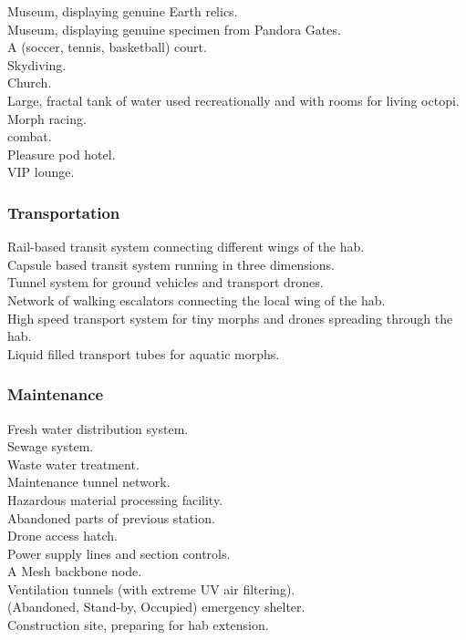 \documentclass[a4]{article}
\begin{document}
\starttableone
Museum, displaying genuine Earth relics.\\
Museum, displaying genuine specimen from Pandora Gates.\\
A (soccer, tennis, basketball) court.\\
Skydiving.\\
Church.\\
Large, fractal tank of water used recreationally and with rooms for living octopi.\\
Morph racing.\\
 combat.\\
Pleasure pod hotel.\\
VIP lounge.\\
\stoptableone



\starttableone

\stoptableone


\subsubsection{Transportation}

\starttableone
Rail-based transit system connecting different wings of the hab.\\
Capsule based transit system running in three dimensions.\\
Tunnel system for ground vehicles and transport drones.\\
Network of walking escalators connecting the local wing of the hab.\\
High speed transport system for tiny morphs and drones spreading through the hab.\\
Liquid filled transport tubes for aquatic morphs.\\
\stoptableone



\subsubsection{Maintenance}

\starttableone
Fresh water distribution system.\\
Sewage system.\\
Waste water treatment.\\
Maintenance tunnel network.\\
Hazardous material processing facility.\\
Abandoned parts of previous station.\\
Drone access hatch.\\
Power supply lines and section controls.\\
A Mesh backbone node.\\
Ventilation tunnels (with extreme UV air filtering).\\
(Abandoned, Stand-by, Occupied) emergency shelter.\\
Construction site, preparing for hab extension.\\
\stoptableone
\end{document}
